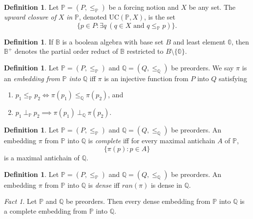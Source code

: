 \documentclass[12pt, twoside]{memoir}
\numberwithin{equation}{section}
\theoremstyle{definition}
\newtheorem{defi}[thm]{Definition}
\theoremstyle{remark}
\newtheorem{fact}[thm]{Fact}
\theoremstyle{definition}
\theoremstyle{definition}
\theoremstyle{definition}
\theoremstyle{remark}
\begin{document}
\begin{defi}
Let $\mathbb{P} = (P, \leq_{\mathbb{P}})$ be a forcing notion and $X$ be any set. The \emph{upward closure of} $X$ \emph{in} $\mathbb{P}$, denoted $\mathrm{UC}(\mathbb{P}, X)$, is the set $$\{p \in P : \exists q \ (q \in X \text{ and } q \leq_{\mathbb{P}} p)\}.$$
\end{defi}

\begin{defi}
If $\mathbb{B}$ is a boolean algebra with base set $B$ and least element $\mathbb{0}$, then $\mathbb{B}^+$ denotes the partial order reduct of $\mathbb{B}$ restricted to $B \setminus \{\mathbb{0}\}$.
\end{defi}

\begin{defi}
Let $\mathbb{P} = (P, \leq_{\mathbb{P}})$ and $\mathbb{Q} = (Q, \leq_{\mathbb{Q}})$ be preorders. We say $\pi$ is an \emph{embedding from} $\mathbb{P}$ \emph{into} $\mathbb{Q}$ iff $\pi$ is an injective function from $P$ into $Q$ satisfying
\begin{enumerate}[label=(\alph*)]
    \item $p_1 \leq_{\mathbb{P}} p_2 \iff \pi(p_1) \leq_{\mathbb{Q}} \pi(p_2)$, and
    \item $p_1 \ \bot_{\mathbb{P}} \ p_2 \implies \pi(p_1) \ \bot_{\mathbb{Q}} \ \pi(p_2)$.
\end{enumerate}
\end{defi}

\begin{defi}
Let $\mathbb{P} = (P, \leq_{\mathbb{P}})$ and $\mathbb{Q} = (Q, \leq_{\mathbb{Q}})$ be preorders. An embedding $\pi$ from $\mathbb{P}$ into $\mathbb{Q}$ is \emph{complete} iff for every maximal antichain $A$ of $\mathbb{P}$, $$\{\pi(p) : p \in A\}$$ is a maximal antichain of $\mathbb{Q}$.
\end{defi}

\begin{defi}
Let $\mathbb{P} = (P, \leq_{\mathbb{P}})$ and $\mathbb{Q} = (Q, \leq_{\mathbb{Q}})$ be preorders. An embedding $\pi$ from $\mathbb{P}$ into $\mathbb{Q}$ is \emph{dense} iff $ran(\pi)$ is dense in $\mathbb{Q}$.
\end{defi}

\begin{fact}\label{dic}
Let $\mathbb{P}$ and $\mathbb{Q}$ be preorders. Then every dense embedding from $\mathbb{P}$ into $\mathbb{Q}$ is a complete embedding from $\mathbb{P}$ into $\mathbb{Q}$.
\end{fact}
\end{document}
